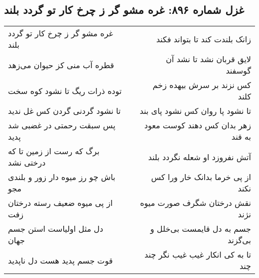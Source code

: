 \begin{center}
\section*{غزل شماره ۸۹۶: غره مشو گر ز چرخ کار تو گردد بلند}
\label{sec:0896}
\begin{longtable}{l p{0.5cm} r}
غره مشو گر ز چرخ کار تو گردد بلند
&&
زانک بلندت کند تا بتواند فکند
\\
قطره آب منی کز حیوان می‌زهد
&&
لایق قربان نشد تا نشد آن گوسفند
\\
توده ذرات ریگ تا نشود کوه سخت
&&
کس نزند بر سرش بیهده زخم کلند
\\
تا نشود گردنی گردن کس غل ندید
&&
تا نشود پا روان کس نشود پای بند
\\
پس سبقت رحمتی در غضبی شد پدید
&&
زهر بدان کس دهند کوست معود به قند
\\
برگ که رست از زمین تا که درختی نشد
&&
آتش نفروزد او شعله نگردد بلند
\\
باش چو رز میوه دار زور و بلندی مجو
&&
از پی خرما بدانک خار ورا کس نکند
\\
از پی میوه ضعیف رسته درختان زفت
&&
نقش درختان شگرف صورت میوه نژند
\\
دل مثل اولیاست استن جسم جهان
&&
جسم به دل قایمست بی‌خلل و بی‌گزند
\\
قوت جسم پدید هست دل ناپدید
&&
تا به کی انکار غیب غیب نگر چند چند
\\
\end{longtable}
\end{center}
